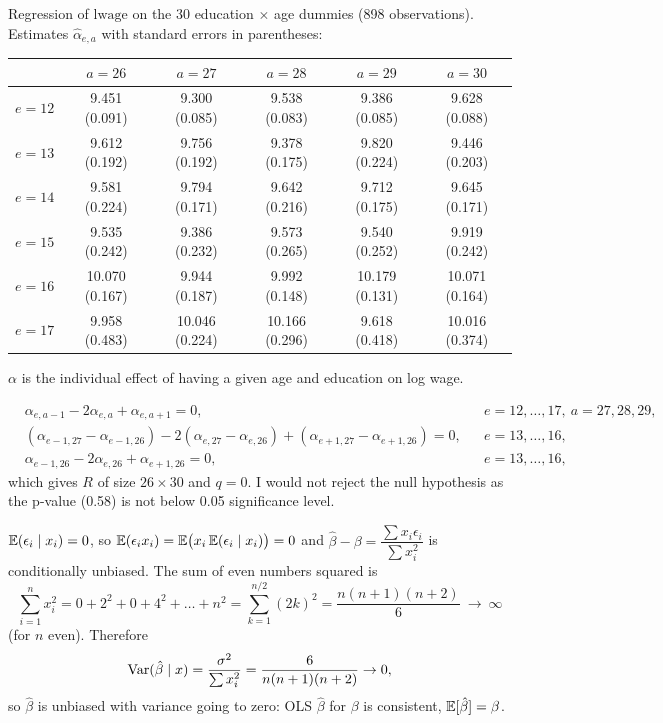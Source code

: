 \documentclass[11pt]{article}
\begin{document}



Regression of $\mathrm{lwage}$ on the 30 education $\times$ age dummies (898 observations). Estimates $\hat\alpha_{e,a}$ with standard errors in parentheses:
\begin{center}
\small
\begin{tabular}{c|ccccc}
 & $a=26$ & $a=27$ & $a=28$ & $a=29$ & $a=30$\\\hline
$e=12$ & 9.451 (0.091) & 9.300 (0.085) & 9.538 (0.083) & 9.386 (0.085) & 9.628 (0.088)\\
$e=13$ & 9.612 (0.192) & 9.756 (0.192) & 9.378 (0.175) & 9.820 (0.224) & 9.446 (0.203)\\
$e=14$ & 9.581 (0.224) & 9.794 (0.171) & 9.642 (0.216) & 9.712 (0.175) & 9.645 (0.171)\\
$e=15$ & 9.535 (0.242) & 9.386 (0.232) & 9.573 (0.265) & 9.540 (0.252) & 9.919 (0.242)\\
$e=16$ & 10.070 (0.167) & 9.944 (0.187) & 9.992 (0.148) & 10.179 (0.131) & 10.071 (0.164)\\
$e=17$ & 9.958 (0.483) & 10.046 (0.224) & 10.166 (0.296) & 9.618 (0.418) & 10.016 (0.374)
\end{tabular}
\end{center}
$\alpha$ is the individual effect of having a given age and education on log wage.

\[
\begin{aligned}
&\alpha_{e,a-1}-2\alpha_{e,a}+\alpha_{e,a+1}=0, && e=12,\dots,17,\ a=27,28,29,\\
&(\alpha_{e-1,27}-\alpha_{e-1,26})-2(\alpha_{e,27}-\alpha_{e,26})+(\alpha_{e+1,27}-\alpha_{e+1,26})=0, && e=13,\dots,16,\\
&\alpha_{e-1,26}-2\alpha_{e,26}+\alpha_{e+1,26}=0, && e=13,\dots,16,
\end{aligned}
\]
which gives $R$ of size $26\times30$ and $q=0$.
I would not reject the null hypothesis as the p-value (0.58) is not below 0.05 significance level.


$\mathbb{E}(\epsilon_i\mid x_i)=0$, so $\mathbb{E}(\epsilon_ix_i)=\mathbb{E}\big(x_i\,\mathbb{E}(\epsilon_i\mid x_i)\big)=0$ and $\hat\beta-\beta=\dfrac{\sum x_i\epsilon_i}{\sum x_i^2}$ is conditionally unbiased. The sum of even numbers squared is
\[
\sum_{i=1}^n x_i^2=0+2^2+0+4^2+\dots+n^2=\sum_{k=1}^{n/2}(2k)^2=\frac{n(n+1)(n+2)}{6}\ \to\ \infty
\]
(for $n$ even). Therefore
\[
\operatorname{Var}(\hat\beta\mid x)=\frac{\sigma^2}{\sum x_i^2}=\frac{6}{n(n+1)(n+2)}\to0 ,
\]
so $\hat\beta$ is unbiased with variance going to zero: OLS $\hat\beta$ for $\beta$ is consistent, $\mathbb{E}[\hat\beta]=\beta$.
\end{document}
